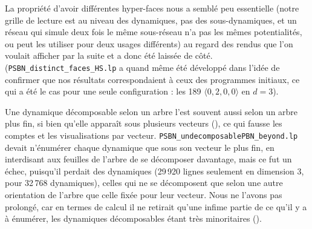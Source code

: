 \documentclass[12pt, a4paper]{article}
\begin{document}
La propriété d'avoir différentes hyper-faces nous a semblé peu essentielle (notre grille de lecture est au niveau des dynamiques, pas des sous-dynamiques, et un réseau qui simule deux fois le même sous-réseau n'a pas les mêmes potentialités, ou peut les utiliser pour deux usages différents) au regard des rendus que l'on voulait afficher par la suite et a donc été laissée de côté. (\texttt{PSBN\_distinct\_faces\_HS.lp} a quand même été développé dans l'idée de confirmer que nos résultats correspondaient à ceux des programmes initiaux, ce qui a été le cas pour une seule configuration : les 189 $\langle 0,2,0,0\rangle$ en $d=3$).

Une dynamique décomposable selon un arbre l'est souvent aussi selon un arbre plus fin, si bien qu'elle apparaît sous plusieurs vecteurs (), ce qui fausse les comptes et les visualisations par vecteur.
\texttt{PSBN\_undecomposablePBN\_beyond.lp} devait n'énumérer chaque dynamique que sous son vecteur le plus fin, en interdisant aux feuilles de l'arbre de se décomposer davantage, mais ce fut un échec, puisqu'il perdait des dynamiques (29\,920 lignes seulement en dimension 3, pour 32\,768 dynamiques), celles qui ne se décomposent que selon une autre orientation de l'arbre que celle fixée pour leur vecteur.
Nous ne l'avons pas prolongé, car en termes de calcul il ne retirait qu'une infime partie de ce qu'il y a à énumérer, les dynamiques décomposables étant très minoritaires ().

\end{document}
